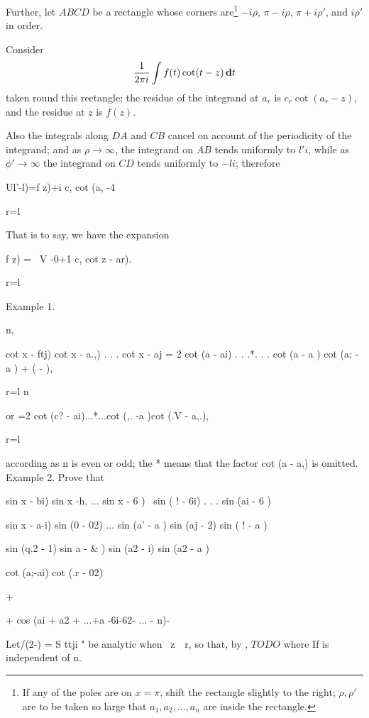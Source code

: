 Further, let $ABCD$ be a rectangle whose corners are\footnote{If any
  of the poles are on $x = \pi$, shift the rectangle slightly to
  the right; $\rho, \rho'$ are to be taken so large that
  $a_{1}, a_{2}, \ldots, a_{n}$ are
  inside the rectangle.}
$-i\rho$, $\pi - i\rho$, $\pi + i\rho'$, and $i\rho'$ in order.

Consider
$$
\frac{1}{2 \pi i}
\int f(t) \cot (t-z) \, \mathbf{d} t
$$
taken round this rectangle; the residue of the integrand at $a_{r}$ is
$c_{r} \cot (a_{r}-z)$, and the residue at $z$ is $f(z)$.

Also the integrals along $DA$ and $CB$ cancel on account of the
periodicity of the integrand; and as $\rho \rightarrow \infty$,
the integrand on $AB$ tends
uniformly to $l' i$, while as $\phi' \rightarrow \infty$
the integrand on $CD$ tends uniformly
to $-li$; therefore

Ul'-l)=f z)+i c, cot (a, -4

r=l

%
%

That is to say, we have the expansion

f z) = \ V -0+1 c, cot z - ar).

  r=l

Example 1.

n,

cot x - ftj) cot x - a.,) . . . cot x - aj = 2 cot (a - ai) . . .*. .
. cot (a - a ) cot (a; - a ) + ( - ),

r=l n

or =2 cot (c? - ai)...*...cot (,. -a )cot (.V - a,.),

r=l

according as n is even or odd; the * means that the factor cot (a -
a,) is omitted. Example 2. Prove that

sin x - bi) sin x -h. ... sin x - 6 ) \ sin ( ! - 6i) . . . sin (ai -
6 )

sin x - a-i) sin (0 - 02) ... sin (a' - a ) sin (aj - 2)  sin ( ! -
a )

sin (q.2 - 1)    sin a - \& ) sin (a2 - i)  sin (a2 - a )

cot (a;-ai) cot (.r - 02)

+

+ cos (ai + a2 + ...+a -6i-62- ... - n)-


Let/(2-) = S ttji " be analytic when \ z\ \ r, so that, by
,
$
TODO
$
where If is independent of n.

